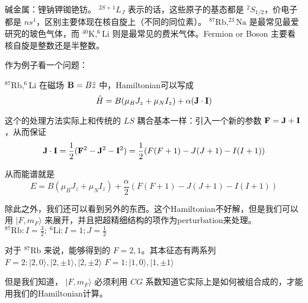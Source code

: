 碱金属：锂钠钾铷铯钫。 $^{2S+1}L_J$ 表示的话，这些原子的基态都是 $^2 S_{1/2}$，价电子都是 $ns^1$，区别主要体现在核自旋上（不同的同位素）。 $^{87}\text{Rb}, ^{23}\text{Na}$ 是最常见最爱研究的玻色气体，而 $^{40}\text{K}, ^6 \text{Li}$ 则是最常见的费米气体。Fermion or Boson 主要看核自旋是整数还是半整数。

作为例子看一个问题：

$^{87}{\text{Rb}}, ^6{\text{Li}}$ 在磁场 ${\bf B} = B\hat{z}$ 中，Hamiltonian可以写成
\begin{equation}
\hat{H} = B(\mu_B J_z+\mu_N I_z)+\alpha({\bf J\cdot I})
\end{equation}

这个的处理方法实际上和传统的 $LS$ 耦合基本一样：引入一个新的参数 ${\bf F = J+I}$，从而保证
\begin{equation}
{\bf J\cdot I} = \frac{1}{2}({\bf F}^2 - {\bf J}^2 - {\bf I}^2) = \frac{1}{2} (F(F+1) - J(J+1) - I(I+1))
\end{equation}

从而能谱就是
\begin{equation}
E = B(\mu_B J_z+\mu_N I_z)+\frac{\alpha}{2} (F(F+1) - J(J+1) - I(I+1))
\end{equation}

除此之外，我们还可以看到另外的东西。这个Hamiltonian不好解，但是我们可以用 $|F,m_F\rangle$ 来展开，并且把超精细结构的项作为perturbation来处理。 $^{87}{\text{Rb}}: I = \frac{3}{2};\ ^6{\text{Li}}: I = 1; J = \frac{1}{2}$

对于 $^{87}{\text{Rb}}$ 来说，能够得到的 $F=2,1$。其本征态有两系列
$F=2:|2,0\rangle,|2,\pm1\rangle,|2,\pm2\rangle$
$F=1:|1,0\rangle,|1,\pm1\rangle$

但是我们知道， $|F,m_F\rangle$ 必须利用 $CG$ 系数知道它实际上是如何被组合成的，才能用我们的Hamiltonian计算。

